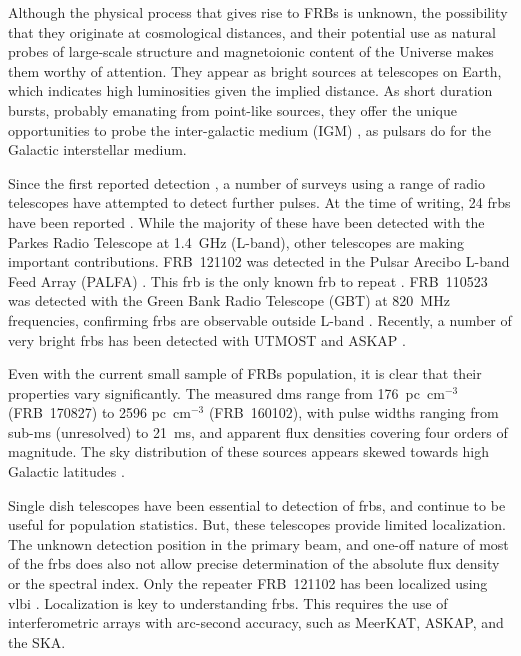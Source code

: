 \documentclass[a4paper,fleqn,usenatbib]{mnras}
\begin{document}
Although the physical process that gives rise to FRBs is unknown, the
possibility that they originate at cosmological distances, and their potential
use as natural probes of large-scale structure and magnetoionic content of the
Universe makes them worthy of attention. They appear as bright sources at
telescopes on Earth, which indicates high luminosities given the implied
distance.  As short duration bursts, probably emanating from point-like sources,
they offer the unique opportunities to probe the inter-galactic medium (IGM)
\citep{2013ApJ...776..125M}, as pulsars do for the Galactic interstellar medium.

Since the first reported detection \citep{2007Sci...318..777L}, a number of
surveys using a range of radio telescopes have attempted to detect further
pulses. At the time of writing, 24 \glspl{frb} have been reported \citep[for an
up-to-date list, see][]{2016PASA...33...45P}. While the majority of these have
been detected with the Parkes Radio Telescope at 1.4~GHz (L-band), other
telescopes are making important contributions. FRB~121102 was detected in the
Pulsar Arecibo L-band Feed Array (PALFA) \citep{2014ApJ...790..101S}. This
\gls{frb} is the only known \gls{frb} to repeat \citep{2016ApJ...833..177S}.
FRB~110523 was detected with the Green Bank Radio Telescope (GBT) at 820~MHz
frequencies, confirming \glspl{frb} are observable outside L-band
\citep{2015Natur.528..523M}.  Recently, a number of very bright \glspl{frb} has
been detected with UTMOST \citep{2017MNRAS.468.3746C,atel10697} and ASKAP
\citep{2017ApJ...841L..12B}.


Even with the current small sample of FRBs population, it is clear that their
properties vary significantly. The measured \glspl{dm} range from
176~pc~cm$^{-3}$ (FRB~170827) to 2596 pc~cm$^{-3}$ (FRB~160102), with pulse
widths ranging from sub-ms (unresolved) to 21~ms, and apparent flux densities
covering four orders of magnitude. The sky distribution of these sources appears
skewed towards high Galactic latitudes \citep{2015MNRAS.451.3278M}.

Single dish telescopes have been essential to detection of \glspl{frb}, and
continue to be useful for population statistics.  But, these telescopes provide
limited localization.  The unknown detection position in the primary beam, and
one-off nature of most of the \glspl{frb} does also not allow precise
determination of the absolute flux density or the spectral index. Only the
repeater FRB~121102 has been localized using \gls{vlbi}
\citep{2017ApJ...834L...8M, 2017ApJ...834L...7T}. Localization is key to
understanding \glspl{frb}. This requires the use of interferometric arrays with
arc-second accuracy, such as MeerKAT, ASKAP, and the SKA. 
\end{document}
